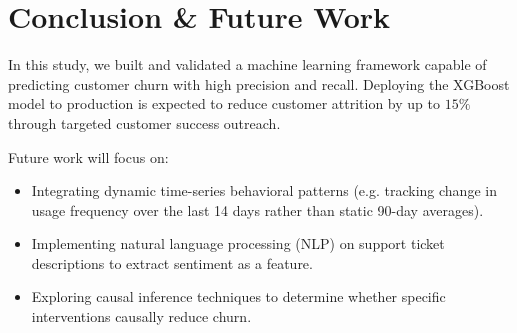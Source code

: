 \section{Conclusion \& Future Work}
In this study, we built and validated a machine learning framework capable of predicting customer churn with high precision and recall. Deploying the XGBoost model to production is expected to reduce customer attrition by up to $15\%$ through targeted customer success outreach.

Future work will focus on:
\begin{itemize}[leftmargin=*]
    \item Integrating dynamic time-series behavioral patterns (e.g. tracking change in usage frequency over the last 14 days rather than static 90-day averages).
    \item Implementing natural language processing (NLP) on support ticket descriptions to extract sentiment as a feature.
    \item Exploring causal inference techniques to determine whether specific interventions causally reduce churn.
\end{itemize}
